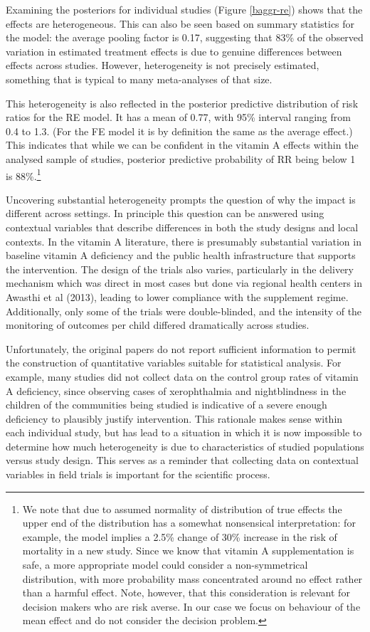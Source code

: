\documentclass[12pt]{article}
\begin{document}
Examining the posteriors for individual studies (Figure \ref{baggr-re}) shows that the effects are heterogeneous. This can also be seen based on summary statistics for the model: the average pooling factor is 0.17, suggesting that 83\% of the observed variation in estimated treatment effects is due to genuine differences between effects across studies. However, heterogeneity is not precisely estimated, something that is typical to many meta-analyses of that size. 

This heterogeneity is also reflected in the posterior predictive distribution of risk ratios for the RE model. It has a mean of 0.77, with 95\% interval ranging from 0.4 to 1.3. (For the FE model it is by definition the same as the average effect.) This indicates that while we can be confident in the vitamin A effects within the analysed sample of studies, posterior predictive probability of RR being below 1 is 88\%.\footnote{We note that due to assumed normality of distribution of true effects the upper end of the distribution has a somewhat nonsensical interpretation: for example, the model implies a 2.5\% change of 30\% increase in the risk of mortality in a new study. Since we know that vitamin A supplementation is safe, a more appropriate model could consider a non-symmetrical distribution, with more probability mass concentrated around no effect rather than a harmful effect. Note, however, that this consideration is relevant for decision makers who are risk averse. In our case we focus on behaviour of the mean effect and do not consider the decision problem.}

Uncovering substantial heterogeneity prompts the question of why the impact is different across settings. In principle this question can be answered using contextual variables that describe differences in both the study designs and local contexts. In the vitamin A literature, there is presumably substantial variation in baseline vitamin A deficiency and the public health infrastructure that supports the intervention. The design of the trials also varies, particularly in the delivery mechanism which was direct in most cases but done via regional health centers in Awasthi et al (2013), leading to lower compliance with the supplement regime. Additionally, only some of the trials were double-blinded, and the intensity of the monitoring of outcomes per child differed dramatically across studies. 

Unfortunately, the original papers do not report sufficient information to permit the construction of quantitative variables suitable for statistical analysis. For example, many studies did not collect data on the control group rates of vitamin A deficiency, since observing cases of xerophthalmia and nightblindness in the children of the communities being studied is indicative of a severe enough deficiency to plausibly justify intervention. This rationale makes sense within each individual study, but has lead to a situation in which it is now impossible to determine how much heterogeneity is due to characteristics of studied populations versus study design. This serves as a reminder that collecting data on contextual variables in field trials is important for the scientific process. 
\end{document}
